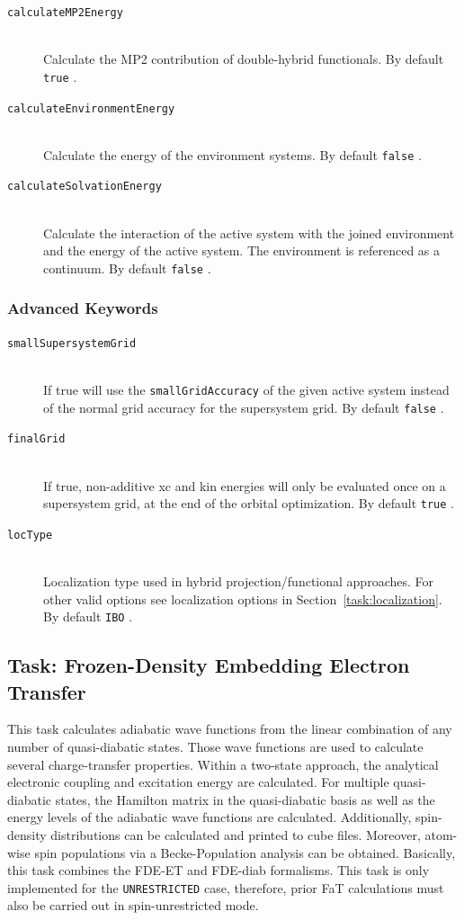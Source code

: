 \documentclass[bibliography=totocnumbered,a4paper,10pt,oneside]{scrbook}
\newcommand{\ttt}[1]{%
  \begingroup\setlength{\fboxsep}{1pt}%
  \colorbox{serenity-green!30}{\texttt{\hspace*{2pt}\vphantom{(g}#1\hspace*{2pt}}}%
  \endgroup
}
\begin{document}
\begin{description}
	\item [\texttt{calculateMP2Energy}] \hfill \\
	Calculate the MP2 contribution of double-hybrid functionals. By default \ttt{true}.
	\item [\texttt{calculateEnvironmentEnergy}] \hfill \\
	Calculate the energy of the environment systems. By default \ttt{false}.
	\item [\texttt{calculateSolvationEnergy}] \hfill \\
	Calculate the interaction of the active system with the joined environment and the energy of the active system. The environment is referenced
	as a continuum. By default \ttt{false}.
\end{description}

\subsubsection{Advanced Keywords}
\begin{description}
	\item [\texttt{smallSupersystemGrid}]\hfill \\
	If true will use the \ttt{smallGridAccuracy} of the given active system instead of the normal grid accuracy for the supersystem grid. By default \ttt{false}.
	\item [\texttt{finalGrid}]\hfill \\
	If true, non-additive xc and kin energies will only be evaluated once on a supersystem grid, at the end of the orbital optimization. By default \ttt{true}.
	\item [\texttt{locType}]\hfill \\
	Localization type used in hybrid projection/functional approaches. For other valid options see localization options in Section~\ref{task:localization}. By default \ttt{IBO}.
\end{description}

\subsection{Task: Frozen-Density Embedding Electron Transfer}

This task calculates adiabatic wave functions from the linear combination of any number of quasi-diabatic states.
Those wave functions are used to calculate several charge-transfer properties. Within a two-state approach, the
analytical electronic coupling and  excitation energy are calculated. For multiple quasi-diabatic states, the Hamilton
matrix in the quasi-diabatic basis as well as the energy levels of the adiabatic wave functions are calculated.
Additionally, spin-density distributions can be calculated and printed to cube files. Moreover, atom-wise spin
populations via a Becke-Population analysis can be obtained. Basically, this task combines the FDE-ET and FDE-diab
formalisms. This task is only implemented for the \ttt{UNRESTRICTED} case, therefore, prior FaT calculations must also be
carried out in spin-unrestricted mode.
\end{document}
